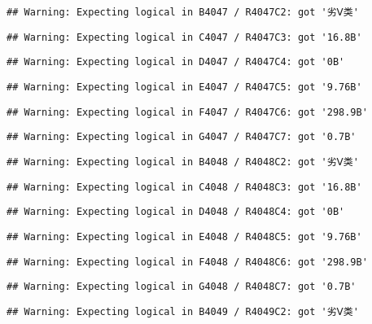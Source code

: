 \documentclass[
]{article}
\begin{document}
\begin{verbatim}
## Warning: Expecting logical in B4047 / R4047C2: got '劣Ⅴ类'
\end{verbatim}

\begin{verbatim}
## Warning: Expecting logical in C4047 / R4047C3: got '16.8B'
\end{verbatim}

\begin{verbatim}
## Warning: Expecting logical in D4047 / R4047C4: got '0B'
\end{verbatim}

\begin{verbatim}
## Warning: Expecting logical in E4047 / R4047C5: got '9.76B'
\end{verbatim}

\begin{verbatim}
## Warning: Expecting logical in F4047 / R4047C6: got '298.9B'
\end{verbatim}

\begin{verbatim}
## Warning: Expecting logical in G4047 / R4047C7: got '0.7B'
\end{verbatim}

\begin{verbatim}
## Warning: Expecting logical in B4048 / R4048C2: got '劣Ⅴ类'
\end{verbatim}

\begin{verbatim}
## Warning: Expecting logical in C4048 / R4048C3: got '16.8B'
\end{verbatim}

\begin{verbatim}
## Warning: Expecting logical in D4048 / R4048C4: got '0B'
\end{verbatim}

\begin{verbatim}
## Warning: Expecting logical in E4048 / R4048C5: got '9.76B'
\end{verbatim}

\begin{verbatim}
## Warning: Expecting logical in F4048 / R4048C6: got '298.9B'
\end{verbatim}

\begin{verbatim}
## Warning: Expecting logical in G4048 / R4048C7: got '0.7B'
\end{verbatim}

\begin{verbatim}
## Warning: Expecting logical in B4049 / R4049C2: got '劣Ⅴ类'
\end{verbatim}
\end{document}
